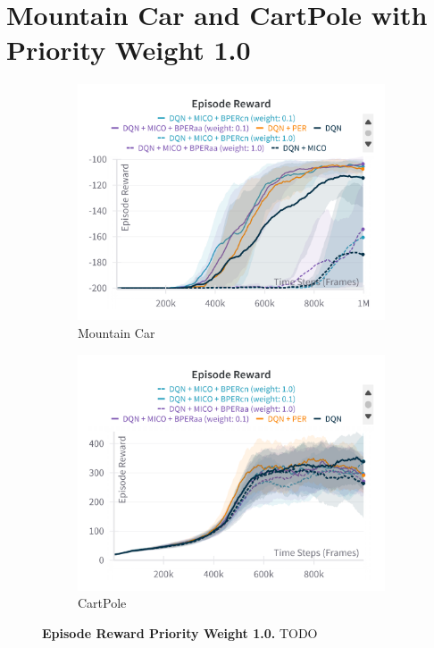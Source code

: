 \section{Mountain Car and CartPole with Priority Weight 1.0}
\label{append:results_priority_weight_1_0}
\begin{figure}[H]
    \centering
    \begin{subfigure}{0.45\textwidth}
    \includegraphics[width=\linewidth]{Results/general_results/return_mountain_car_weigh_1.png}
        \caption{Mountain Car}
        \label{fig:return_mountain_car_weigh_1}
    \end{subfigure}
    \hfill
    \begin{subfigure}{0.45\textwidth}
        \includegraphics[width=\linewidth]{Results/general_results/return_cartpolev1_weight_1.png}
        \caption{CartPole}
        \label{fig:return_cartpolev1_weight_1}
    \end{subfigure}
    \caption[Episode Reward Priority Weight 1.0]{\textbf{Episode Reward Priority Weight 1.0.} TODO}
    \label{fig:return_methods_weight_1}
\end{figure}

